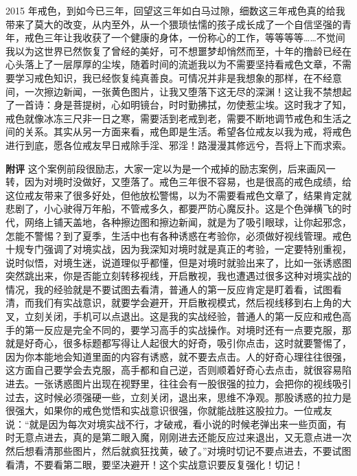 \begin{case}
    2015 年戒色，到如今已三年，回望这三年如白马过隙，细数这三年戒色真的给我带来了莫大的改变，从内至外，从一个猥琐怯懦的孩子成长成了一个自信坚强的青年，戒色三年让我收获了一个健康的身体，一份称心的工作，等等等等……不觉间我以为这世界已然恢复了曾经的美好，可不想噩梦却悄然而至，十年的撸龄已经在心头落上了一层厚厚的尘埃，随着时间的流逝我以为不需要坚持看戒色文章，不需要学习戒色知识，我已经恢复纯真善良。可情况并非是我想象的那样，在不经意间，一次擦边新闻，一张黄色图片，让我又堕落下这无尽的深渊！这让我不禁想起了一首诗：身是菩提树，心如明镜台，时时勤拂拭，勿使惹尘埃。这时我才了知，戒色就像冰冻三尺非一日之寒，需要活到老戒到老，需要不断地调节戒色和生活之间的关系。其实从另一方面来看，戒色即是生活。希望各位戒友以我为戒，将戒色进行到底，愿各位戒友早日戒除手淫、邪淫！路漫漫其修远兮，吾将上下而求索。

    \textbf{附评} 这个案例前段很励志，大家一定以为是一个戒掉的励志案例，后来画风一转，因为对境时没做好，又堕落了。戒色三年很不容易，也是很高的戒色成绩，给这位戒友带来了很多好处，但他放松警惕，以为不需要看戒色文章了，结果肯定就悲剧了，小心驶得万年船，不管戒多久，都要严防心魔反扑。这是个色弹横飞的时代，网络上铺天盖地，各种擦边图和擦边新闻，就是为了吸引眼球，让你起邪念，怎能不警惕？到了夏季，生活中也有各种诱惑在考验你，必须做好视线管理。戒色十规专门强调了对境实战，因为我深知对境时就是真正的考验，一定要特别重视，说时似悟，对境生迷，说道理似乎都懂，但是对境时就验出来了，比如一张诱惑图突然跳出来，你是否能立刻转移视线，开启散视，我也遭遇过很多这种对境实战的情况，我的经验就是不要试图去看清，普通人的第一反应肯定是盯着看，试图看清，而我们有实战意识，就要学会避开，开启散视模式，然后视线移到右上角的大叉，立刻关闭，手机可以点退出。这是我的实战经验，普通人的第一反应和戒色高手的第一反应是完全不同的，要学习高手的实战操作。对境时还有一点要克服，那就是好奇心，很多标题都写得让人起很大的好奇，吸引你点击，这时就要警惕了，因为你本能地会知道里面的内容有诱惑，就不要去点击。人的好奇心理往往很强，这方面自己要学会去克服，高手都和自己逆，否则顺着好奇心去点击，就很容易陷进去。一张诱惑图片出现在视野里，往往会有一股很强的拉力，会把你的视线吸引过去，这时候必须强硬一些，立刻关闭，退出来，思维不净观。那股诱惑的拉力是很强大，如果你的戒色觉悟和实战意识很强，你就能战胜这股拉力。一位戒友说：“就是因为每次对境实战不行，才破戒，看小说的时候老弹出来一些页面，有时无意点进去，真的是第二眼入魔，刚刚进去还能反应过来退出，又无意点进一次然后想看清那些图片，然后就疯狂找黄，破了。”对境时切记不要点进去，不要试图看清，不要看第二眼，要坚决避开！这个实战意识要反复强化！切记！


\end{case}

